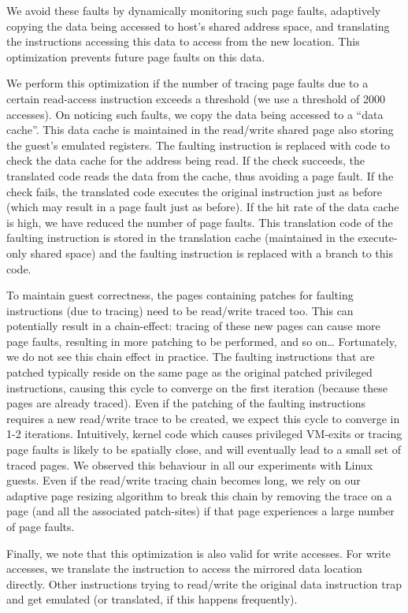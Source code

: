 \documentclass[10pt,twocolumn]{article}
\begin{document}
We avoid these faults by dynamically monitoring such page faults, adaptively
copying the data being accessed to host's shared address space, and
translating the instructions accessing this data to access from the new location.
This optimization prevents future page faults on this data.

We perform this optimization if the number of tracing page faults
due to a certain read-access instruction exceeds a threshold (we use a threshold
of 2000 accesses). On noticing
such faults, we copy the data being accessed
to a ``data cache''. This data cache is maintained in the read/write shared page
also storing the guest's emulated registers.
The faulting instruction is replaced with
code to check the data cache for the address being read. If the check succeeds, the
translated code reads the data from the cache, thus avoiding a page fault.
If the check fails, the translated code executes the original
instruction just as before (which may result in a page fault just as before).
If the hit rate of the data cache is high, we have reduced the number of page faults.
This translation code of the faulting instruction is stored in the translation
cache (maintained in the execute-only shared space) and the faulting
instruction is replaced with a branch to this code.

To maintain guest correctness, the pages containing patches for
faulting instructions (due to tracing) need to be read/write traced too.
This can potentially result in a chain-effect: tracing of these new pages
can cause more page faults, resulting in more patching to be performed, and so on\ldots
Fortunately, we do not see this chain effect in practice. The faulting instructions
that are patched typically reside on the same
page as the original patched privileged instructions, causing this
cycle to converge on the first iteration (because these pages are already traced).
Even if the patching of the faulting instructions requires a new read/write trace to be
created, we expect this
cycle to converge in 1-2 iterations. Intuitively, kernel
code which causes privileged
VM-exits or tracing page faults is likely to be spatially close, and will eventually
lead to a small set of traced pages. We observed this behaviour in all our experiments
with Linux guests. Even if the read/write tracing chain becomes long, we rely on
our adaptive page resizing algorithm to break this chain by removing the
trace on a page (and all the associated patch-sites)
if that page experiences a large number of page faults.

Finally, we note that this optimization is also valid for write accesses. For write
accesses, we translate the instruction to access the mirrored data location
directly. Other instructions trying to read/write the original data instruction
trap and get emulated (or translated, if this happens frequently).
\end{document}
